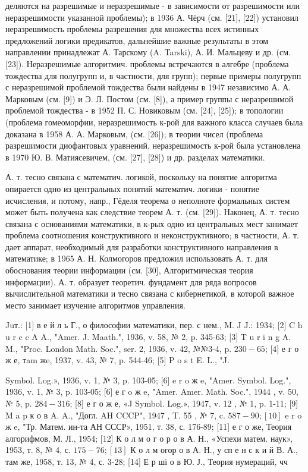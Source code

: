 \documentclass[10pt]{article}
\begin{document}
деляются на разрешимые и неразрешимые - в зависимости от разрешимости или неразрешимости указанной проблемы); в 1936 А. Чёрч (см. [21], [22]) установил неразрешимость проблемы разрешения для множества всех истинных предложений логики предикатов, дальнейшие важные результаты в этом направлении принадлежат А. Тарскому (A. Tarski), А. И. Мальцеву и др. (см. [23]). Неразрешимые алгоритмич. проблемы встречаются в алгебре (проблема төждества для полугрупп и, в частности, для групп); первые примеры полугрупп с неразрешимой проблемой тождества были найдены в 1947 независимо А. А. Марковым (см. [9]) и Э. Л. Постом (см. [8]), а пример группы с неразрешимой проблемой тождества - в 1952 П. С. Новиковым (см. [24], [25]); в топологии (проблема гомеоморфии, неразрешимость к-рой для важного класса случаев была доказана в 1958 А. А. Марковым, (см. [26]); в теории чисел (проблема разрешимости диофантовых уравнений, неразрешимость к-рой была установлена в 1970 Ю. В. Матиясевичем, (см. [27], [28]) и др. разделах математики.



А. т. тесно связана с математич. логикой, поскольку на понятие алгоритма опирается одно из центральных понятий математич. логики - понятие исчисления, и потому, напр., Гёделя теорема о неполноте формальных систем может быть получена как следствие теорем А. т. (см. [29]). Наконец, А. т. тесно связана с основаниями математики, в к-рых одно из центральных мест занимает проблема соотношения конструктивного и неконструктивного; в частности, А. т. дает аппарат, необходимый для разработки конструктивного направления в математике; в 1965 А. Н. Колмогоров предложил использовать А. т. для обоснования теории информации (см. [30], Алгоритмическая теория информации). А. т. образует теоретич. фундамент для ряда вопросов вычислительной математики и тесно связана с кибернетикой, в которой важное место занимает изучение алгоритмов управления.



Juт.: [1] в е й л ь Г., о философии математики, пер. с нем., M. J J.: 1934; [2] C $\mathrm{h}$ u r c c A A., "Amer. J. Maath.", 1936, v. 58, № 2, p. 345-63; [3] T u r i n g A. M., "Proc. London Math. Soc.", ser. 2, 1936, v. 42, №№3-4, p. $230-65$; [4] е г о ж е, тam жe, 1937, v. 43, № 7, p. 544-46; [5] P o s t E. L., "J.

Symbol. Log.», 1936, v. 1, № 3, p. 103-05; [6] e r o ж e, "Amer. Symbol. Log.", 1936, v. 1, № 3, p. 103-05; [6] е г o ж e, "Amer. Amer. Math. Soc.", 1944 , v. 50, № 5, p. $284-316$; [8] е г о ж е, «J Symbol. Log.», 1947, v. 12 , № 1, p. 1-11; [9] M a p к о в A. A., "Догл. AH CCCP", 1947 , T. 55 , № 7, c. $587-90 ;[10]$ e r o ж e, "Тр. Матем. ин-та АН СССР», 1951, т. 38, с. 176-89; [11] е г о же, Теория алгорифмов, М. Л., 1954; [12] К о л м о г о р о в А. Н., «Успехи матем. наук», 1953, т. 8, № 4, с. $175-76 ;[13]$ К о л м огор о в А. Н., у сп е н с к и й В. А., там же, 1958, т. 13, № 4, с. 3-28; [14] Е р ші о в Ю. Ј., Теория нумераций, чч
\end{document}
